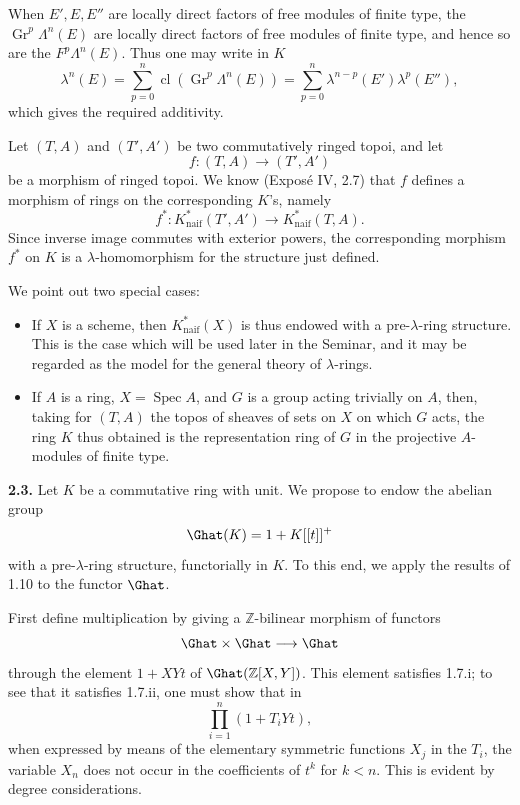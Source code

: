 When \(E',E,E''\) are locally direct factors of free modules of finite type, the \(\operatorname{Gr}^p\Lambda^n(E)\) are locally direct factors of free modules of finite type, and hence so are the \(F^p\Lambda^n(E)\). Thus one may write in \(K\)
\[
  \lambda^n(E)=\sum_{p=0}^{n}\operatorname{cl}(\operatorname{Gr}^p\Lambda^n(E))
  =
  \sum_{p=0}^{n}\lambda^{n-p}(E')\lambda^p(E''),
\]
which gives the required additivity.

Let \((T,A)\) and \((T',A')\) be two commutatively ringed topoi, and let
\[
  f:(T,A)\longrightarrow (T',A')
\]
be a morphism of ringed topoi. We know (Exposé IV, 2.7) that \(f\) defines a morphism of rings on the corresponding \(K\)'s, namely
\[
  f^*:K^*_{\mathrm{naif}}(T',A')\longrightarrow K^*_{\mathrm{naif}}(T,A).
\]
Since inverse image commutes with exterior powers, the corresponding morphism \(f^*\) on \(K\) is a \(\lambda\)-homomorphism for the structure just defined.

We point out two special cases:
\begin{itemize}
\item If \(X\) is a scheme, then \(K^*_{\mathrm{naif}}(X)\) is thus endowed with a pre-\(\lambda\)-ring structure. This is the case which will be used later in the Seminar, and it may be regarded as the model for the general theory of \(\lambda\)-rings.
\item If \(A\) is a ring, \(X=\operatorname{Spec}A\), and \(G\) is a group acting trivially on \(A\), then, taking for \((T,A)\) the topos of sheaves of sets on \(X\) on which \(G\) acts, the ring \(K\) thus obtained is the representation ring of \(G\) in the projective \(A\)-modules of finite type.
\end{itemize}

\textbf{2.3.} Let \(K\) be a commutative ring with unit. We propose to endow the abelian group
\[
  \Ghat(K)=1+K[[t]]^+
\]
with a pre-\(\lambda\)-ring structure, functorially in \(K\). To this end, we apply the results of 1.10 to the functor \(\Ghat\).

First define multiplication by giving a \(\mathbb Z\)-bilinear morphism of functors
\[
  \Ghat\times\Ghat\longrightarrow\Ghat
\]
through the element \(1+XYt\) of \(\Ghat(\mathbb Z[X,Y])\). This element satisfies 1.7.i; to see that it satisfies 1.7.ii, one must show that in
\[
  \prod_{i=1}^{n}(1+T_iYt),
\]
when expressed by means of the elementary symmetric functions \(X_j\) in the \(T_i\), the variable \(X_n\) does not occur in the coefficients of \(t^k\) for \(k<n\). This is evident by degree considerations.

